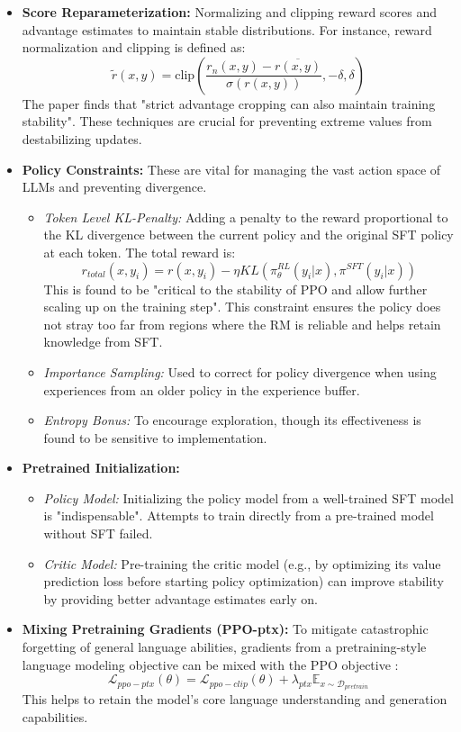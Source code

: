 \documentclass{article} %
\begin{document}
\begin{itemize}
    \item \textbf{Score Reparameterization:} Normalizing and clipping reward scores and advantage estimates to maintain stable distributions. For instance, reward normalization and clipping is defined as:
    $$ \tilde{r}(x,y)=\text{clip}\left(\frac{r_{n}(x,y)-\overline{r(x,y)}}{\sigma(r(x,y))},-\delta,\delta\right) $$
    The paper finds that "strict advantage cropping can also maintain training stability". \cite{Zheng2023PPO} These techniques are crucial for preventing extreme values from destabilizing updates.
    \item \textbf{Policy Constraints:} These are vital for managing the vast action space of LLMs and preventing divergence.
        \begin{itemize}
            \item \textit{Token Level KL-Penalty:} Adding a penalty to the reward proportional to the KL divergence between the current policy and the original SFT policy at each token. The total reward is:
            $$ r_{total}(x,y_i) = r(x,y_i) - \eta KL(\pi_\theta^{RL}(y_i|x),\pi^{SFT}(y_i|x)) $$
            This is found to be "critical to the stability of PPO and allow further scaling up on the training step". \cite{Zheng2023PPO} This constraint ensures the policy does not stray too far from regions where the RM is reliable and helps retain knowledge from SFT.
            \item \textit{Importance Sampling:} Used to correct for policy divergence when using experiences from an older policy in the experience buffer.
            \item \textit{Entropy Bonus:} To encourage exploration, though its effectiveness is found to be sensitive to implementation.
        \end{itemize}
    \item \textbf{Pretrained Initialization:}
        \begin{itemize}
            \item \textit{Policy Model:} Initializing the policy model from a well-trained SFT model is "indispensable". \cite{Zheng2023PPO} Attempts to train directly from a pre-trained model without SFT failed.
            \item \textit{Critic Model:} Pre-training the critic model (e.g., by optimizing its value prediction loss before starting policy optimization) can improve stability by providing better advantage estimates early on. \cite{Zheng2023PPO}
        \end{itemize}
    \item \textbf{Mixing Pretraining Gradients (PPO-ptx):} To mitigate catastrophic forgetting of general language abilities, gradients from a pretraining-style language modeling objective can be mixed with the PPO objective \cite{Zheng2023PPO}:
    $$ \mathcal{L}_{ppo-ptx}(\theta)=\mathcal{L}_{ppo-clip}(\theta)+\lambda_{ptx}\mathbb{E}_{x\sim\mathcal{D}_{pretrain}} $$
    This helps to retain the model's core language understanding and generation capabilities.
\end{itemize}
\end{document}
